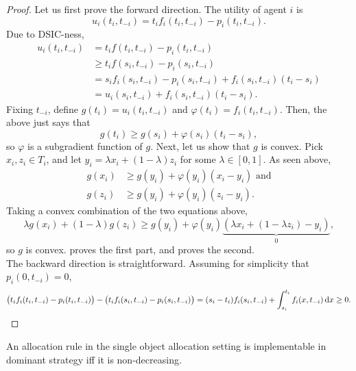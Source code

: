 		\begin{proof}
			Let us first prove the forward direction. The utility of agent $i$ is
			\[ u_i(t_i,t_{-i}) = t_if_i(t_i,t_{-i}) - p_i(t_i,t_{-i}). \]
			Due to DSIC-ness,
			\begin{align*}
				u_i(t_i,t_{-i}) &= t_if(t_i,t_{-i}) - p_i(t_i,t_{-i}) \\
					&\ge t_i f(s_i,t_{-i}) - p_i(s_i,t_{-i}) \\
					&= s_if_i(s_i,t_{-i}) - p_i(s_i,t_{-i}) + f_i(s_i,t_{-i})(t_i - s_i) \\
					&= u_i(s_i,t_{-i}) + f_i(s_i,t_{-i}) (t_i-s_i).
			\end{align*}
			Fixing $t_{-i}$, define $g(t_i) = u_i(t_i,t_{-i})$ and $\varphi(t_i) = f_i(t_i,t_{-i})$. Then, the above just says that
			\[ g(t_i) \ge g(s_i) + \varphi(s_i) (t_i-s_i), \]
			so $\varphi$ is a subgradient function of $g$. Next, let us show that $g$ is convex. Pick $x_i,z_i \in T_i$, and let $y_i = \lambda x_i + (1-\lambda) z_i$ for some $\lambda \in [0,1]$. As seen above,
			\begin{align*}
				g(x_i) &\ge g(y_i) + \varphi(y_i)(x_i-y_i) \text{ and} \\
				g(z_i) &\ge g(y_i) + \varphi(y_i)(z_i-y_i).
			\end{align*}
			Taking a convex combination of the two equations above,
			\[ \lambda g(x_i) + (1-\lambda) g(z_i) \ge g(y_i) + \varphi(y_i)\underbrace{(\lambda x_i + (1-\lambda z_i) - y_i)}_{0}, \]
			so $g$ is convex.  proves the first part, and  proves the second.\\

			The backward direction is straightforward. Assuming for simplicity that $p_i(0,t_{-i}) = 0$,
			\[ \left(t_if_i(t_i,t_{-i}) - p_i(t_i,t_{-i})\right) - \left(t_if_i(s_i,t_{-i}) - p_i(s_i,t_{-i})\right) = (s_i-t_i)f_i(s_i,t_{-i}) + \int_{s_i}^{t_i} f_i(x,t_{-i}) \dif x \ge 0. \qedhere \]
		\end{proof}

		\begin{fcor}
			An allocation rule in the single object allocation setting is implementable in dominant strategy iff it is non-decreasing.
		\end{fcor}

